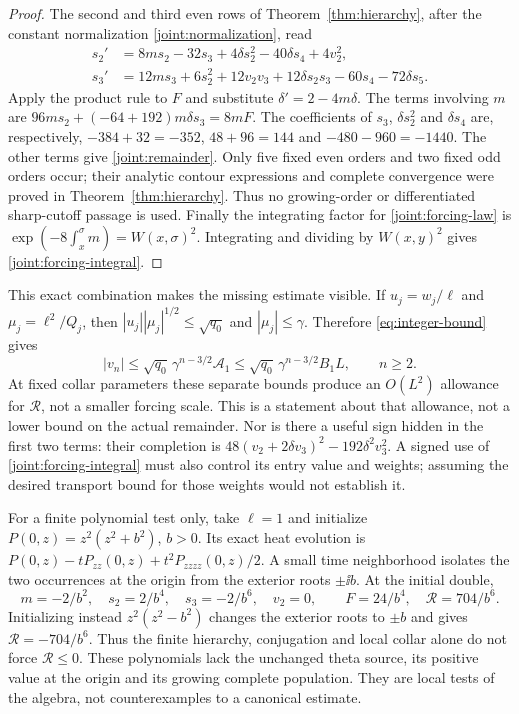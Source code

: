 \begin{proof}
The second and third even rows of Theorem~\ref{thm:hierarchy}, after the
constant normalization \eqref{joint:normalization}, read
\begin{align*}
 s_2'&=8ms_2-32s_3+4\delta s_2^2-40\delta s_4+4v_2^2,\\
 s_3'&=12ms_3+6s_2^2+12v_2v_3+12\delta s_2s_3
                   -60s_4-72\delta s_5.
\end{align*}
Apply the product rule to $F$ and substitute $\delta'=2-4m\delta$.
The terms involving $m$ are
$96ms_2+(-64+192)m\delta s_3=8mF$.
The coefficients of $s_3$, $\delta s_2^2$ and $\delta s_4$ are,
respectively, $-384+32=-352$, $48+96=144$ and $-480-960=-1440$.
The other terms give \eqref{joint:remainder}. Only five fixed even orders
and two fixed odd orders occur; their analytic contour expressions and
complete convergence were proved in Theorem~\ref{thm:hierarchy}.
Thus no growing-order or differentiated sharp-cutoff passage is used.
Finally the integrating factor for \eqref{joint:forcing-law} is
$\exp(-8\int_x^\sigma m)=W(x,\sigma)^2$. Integrating and dividing by
$W(x,y)^2$ gives \eqref{joint:forcing-integral}.
\end{proof}

This exact combination makes the missing estimate visible. If
$u_j=w_j/\ell$ and $\mu_j=\ell^2/Q_j$, then
$|u_j||\mu_j|^{1/2}\le\sqrt{q_0}$ and $|\mu_j|\le\gamma$.
Therefore \eqref{eq:integer-bound} gives
\begin{equation}
 |v_n|\le\sqrt{q_0}\,\gamma^{n-3/2}\mathcal A_1
          \le\sqrt{q_0}\,\gamma^{n-3/2}B_1L,
 \qquad n\ge2.
 \label{joint:odd-bound}
\end{equation}
At fixed collar parameters these separate bounds produce an $O(L^2)$
allowance for $\mathcal R$, not a smaller forcing scale. This is a
statement about that allowance, not a lower bound on the actual remainder.
Nor is there a useful sign hidden in the first two terms: their completion
is $48(v_2+2\delta v_3)^2-192\delta^2v_3^2$. A signed use of
\eqref{joint:forcing-integral} must also control its entry value and
weights; assuming the desired transport bound for those weights would
not establish it.

\begin{remark}\label{joint:quartic-test}
For a finite polynomial test only, take $\ell=1$ and initialize
$P(0,z)=z^2(z^2+b^2)$, $b>0$. Its exact heat evolution is
$P(0,z)-tP_{zz}(0,z)+t^2P_{zzzz}(0,z)/2$. A small time neighborhood
isolates the two occurrences at the origin from the exterior roots
$\pm\ii b$. At the initial double,
\[
 m=-2/b^2,\quad s_2=2/b^4,\quad s_3=-2/b^6,\quad v_2=0,
 \qquad F=24/b^4,\quad \mathcal R=704/b^6.
\]
Initializing instead $z^2(z^2-b^2)$ changes the exterior roots to
$\pm b$ and gives $\mathcal R=-704/b^6$. Thus the finite hierarchy,
conjugation and local collar alone do not force $\mathcal R\le0$.
These polynomials lack the unchanged theta source, its positive value at
the origin and its growing complete population. They are local tests of
the algebra, not counterexamples to a canonical estimate.
\end{remark}

